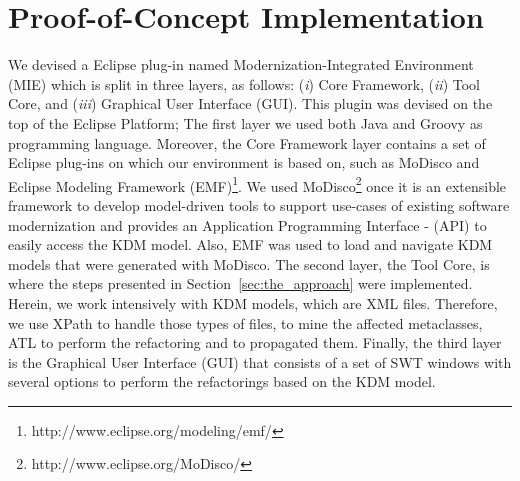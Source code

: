 \section{Proof-of-Concept Implementation}

We devised a Eclipse plug-in named Modernization-Integrated Environment (MIE) which is split in three layers, as follows: (\textit{i}) Core Framework, (\textit{ii}) Tool Core, and (\textit{iii}) Graphical User Interface (GUI). This plugin was devised on the top of the Eclipse Platform; The first layer we used both Java and Groovy as programming language. Moreover, the Core Framework layer contains a set of Eclipse plug-ins on which our environment is based on, such as MoDisco and Eclipse Modeling Framework (EMF)\footnote{http://www.eclipse.org/modeling/emf/}. We used MoDisco\footnote{http://www.eclipse.org/MoDisco/} once it is an extensible framework to develop model-driven tools to support use-cases of existing software modernization and provides an Application Programming Interface - (API) to easily access the KDM model. Also, EMF was used to load and navigate KDM models that were generated with MoDisco. The second layer, the Tool Core, is where the steps presented in Section~\ref{sec:the_approach} were implemented. Herein, we work intensively with KDM models, which are XML files. Therefore, we use XPath to handle those types of files, to mine the affected metaclasses, ATL to perform the refactoring and to propagated them. Finally, the third layer is the Graphical User Interface (GUI) that consists of a set of SWT windows with several options to perform the refactorings based on the KDM model.





